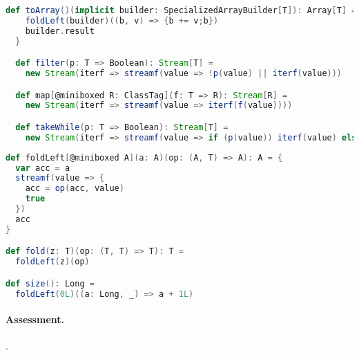 \begin{lstlisting}[language=scala, caption=Basic intermediate operators.]
  def toArray()(implicit builder: SpecializedArrayBuilder[T]): Array[T] = {
    foldLeft(builder)((b, v) => {b += v;b})
    builder.result
  }

  def filter(p: T => Boolean): Stream[T] =
    new Stream(iterf => streamf(value => !p(value) || iterf(value)))

  def map[@miniboxed R: ClassTag](f: T => R): Stream[R] = 
    new Stream(iterf => streamf(value => iterf(f(value))))

  def takeWhile(p: T => Boolean): Stream[T] = 
    new Stream(iterf => streamf(value => if (p(value)) iterf(value) else false))
\end{lstlisting}

\begin{lstlisting}[language=scala, caption=Basic terminal operators.]
def foldLeft[@miniboxed A](a: A)(op: (A, T) => A): A = {
  var acc = a
  streamf(value => {
    acc = op(acc, value)
    true
  })
  acc
}

def fold(z: T)(op: (T, T) => T): T = 
  foldLeft(z)(op)

def size(): Long = 
  foldLeft(0L)((a: Long, _) => a + 1L)
\end{lstlisting}

\paragraph{Assessment. } .